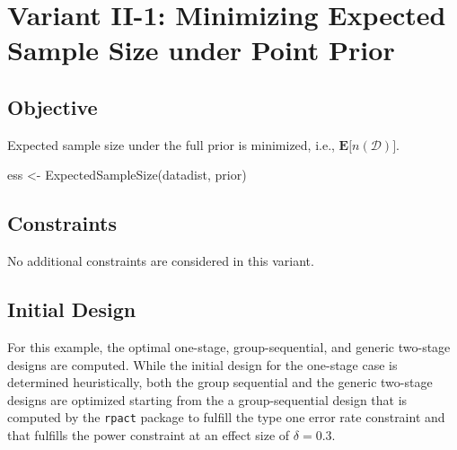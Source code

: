 \documentclass[
]{book}
\newenvironment{Shaded}{\begin{snugshade}}{\end{snugshade}}
\newcommand{\FunctionTok}[1]{\textcolor[rgb]{0.00,0.00,0.00}{#1}}
\newcommand{\NormalTok}[1]{#1}
\newcommand{\OtherTok}[1]{\textcolor[rgb]{0.56,0.35,0.01}{#1}}
\begin{document}
\hypertarget{variantII_1}{%
\section{Variant II-1: Minimizing Expected Sample Size under Point Prior}\label{variantII_1}}

\hypertarget{objective-3}{%
\subsection{Objective}\label{objective-3}}

Expected sample size under the full prior is minimized, i.e.,
\(\boldsymbol{E}\big[n(\mathcal{D})\big]\).

\begin{Shaded}
\begin{Highlighting}[]
\NormalTok{ess }\OtherTok{\textless{}{-}} \FunctionTok{ExpectedSampleSize}\NormalTok{(datadist, prior)}
\end{Highlighting}
\end{Shaded}

\hypertarget{constraints-3}{%
\subsection{Constraints}\label{constraints-3}}

No additional constraints are considered in this variant.

\hypertarget{initial-design-2}{%
\subsection{Initial Design}\label{initial-design-2}}

For this example, the optimal one-stage, group-sequential, and generic
two-stage designs are computed.
While the initial design for the one-stage case is determined heuristically,
both the group sequential and the generic two-stage designs are
optimized starting from the a group-sequential design that is computed by
the \texttt{rpact} package to fulfill the type one error rate constraint and
that fulfills the power constraint at an effect size of \(\delta = 0.3\).
\end{document}
